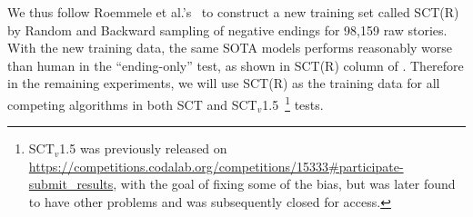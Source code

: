 We thus follow Roemmele et al.'s~\cite{roemmele2017rnn} to construct
a new training set called SCT(R) by Random and Backward sampling of 
negative endings for 98,159 raw stories. With the new training data, 
the same SOTA models performs reasonably worse than human in the ``ending-only'' test,
as shown in SCT(R) column of . Therefore in the remaining experiments,
we will use SCT(R) as the training data for all competing algorithms in both SCT and 
SCT$_v$1.5~\footnote{SCT$_v$1.5 was previously released on \url{https://competitions.codalab.org/competitions/15333\#participate-submit\_results}, with the goal of fixing some of the bias, but was later
found to have other problems and was subsequently closed for access.}
tests.
 


